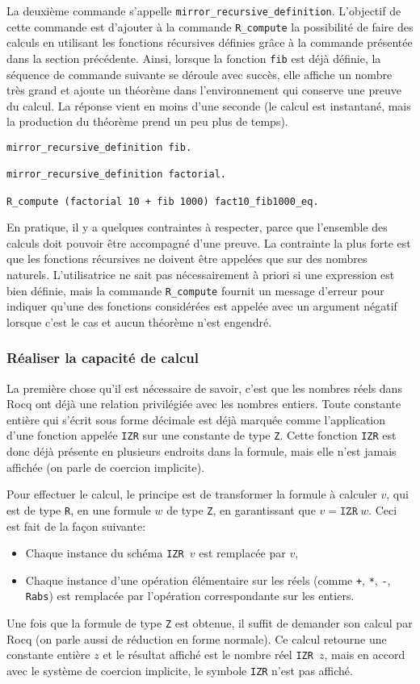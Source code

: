 \documentclass{modjflart}
\begin{document}
La deuxième commande s'appelle \texttt{mirror\_recursive\_definition}.
L'objectif de cette commande est d'ajouter à la commande
\texttt{R\_compute} la possibilité de faire des calculs en utilisant
les fonctions récursives définies grâce à la commande présentée dans
la section précédente.  Ainsi, lorsque la fonction \texttt{fib} est
déjà définie, la séquence de commande suivante se déroule avec succès,
elle affiche un nombre très grand et ajoute un théorème dans
l'environnement qui conserve une preuve du calcul.  La réponse vient
en moins d'une seconde (le calcul est instantané, mais la production
du théorème prend un peu plus de temps).
\begin{verbatim}
mirror_recursive_definition fib.

mirror_recursive_definition factorial.

R_compute (factorial 10 + fib 1000) fact10_fib1000_eq.
\end{verbatim}
En pratique, il y a quelques contraintes à respecter, parce que
l'ensemble des calculs doit pouvoir être accompagné d'une preuve.  La
contrainte la plus forte est que les fonctions récursives ne doivent
être appelées que sur des nombres naturels.  L'utilisatrice ne sait
pas nécessairement à priori si une expression est bien définie, mais
la commande \texttt{R\_compute} fournit un message d'erreur pour indiquer
qu'une des fonctions considérées est appelée avec un argument négatif
lorsque c'est le cas et aucun théorème n'est engendré.

\subsubsection{Réaliser la capacité de calcul}
La première chose qu'il est nécessaire de savoir, c'est que les
nombres réels dans Rocq ont déjà une relation privilégiée avec les
nombres entiers.  Toute constante entière qui s'écrit sous forme
décimale est déjà marquée comme l'application d'une fonction appelée
\texttt{IZR} sur une constante de type \texttt{Z}.  Cette fonction \texttt{IZR}
est donc déjà présente en plusieurs endroits dans la formule, mais
elle n'est jamais affichée (on parle de coercion implicite).

Pour effectuer le calcul, le principe est de transformer la formule à
calculer \(v\), qui est de type \texttt{R}, en une formule \(w\)
de type \texttt{Z}, en garantissant que \(v = \texttt{IZR}~w\).  Ceci est
fait de la façon suivante:
\begin{itemize}
\item Chaque instance du schéma \texttt{IZR \(v\)} est remplacée par \(v\),
\item Chaque instance d'une opération élémentaire sur les
réels (comme \texttt{+}, \texttt{*}, \texttt{-}, \texttt{Rabs}) est remplacée par
l'opération correspondante sur les entiers.
\end{itemize}
Une fois que la formule de type \texttt{Z} est obtenue, il suffit de demander
son calcul par Rocq (on parle aussi de réduction en forme normale).
Ce calcul retourne une constante entière \(z\) et le résultat
affiché est le nombre réel \texttt{IZR \(z\)}, mais en accord avec le
système de coercion implicite, le symbole \texttt{IZR} n'est pas affiché.
\end{document}
